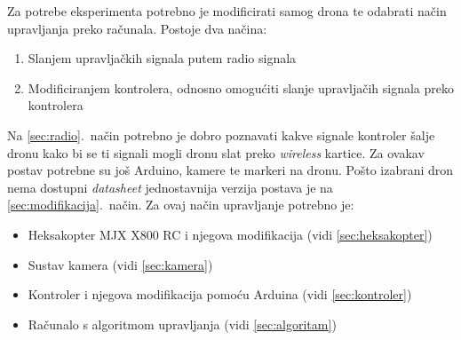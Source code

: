 \documentclass[times, utf8, diplomski]{fer}
\begin{document}
Za potrebe eksperimenta potrebno je modificirati samog drona te odabrati način upravljanja preko računala. Postoje dva načina:
\begin{enumerate}
\item Slanjem upravljačkih signala putem radio signala\label{sec:radio}
\item Modificiranjem kontrolera, odnosno omogućiti slanje upravljačih signala preko kontrolera\label{sec:modifikacija}
\end{enumerate}
Na \ref{sec:radio}.~način potrebno je dobro poznavati kakve signale kontroler šalje dronu kako bi se ti signali mogli dronu slat preko \emph{wireless} kartice. Za ovakav postav potrebne su još Arduino, kamere te markeri na dronu. Pošto izabrani dron nema dostupni \emph{datasheet} jednostavnija verzija postava je  na \ref{sec:modifikacija}.~način. Za ovaj način upravljanje potrebno je:
\begin{itemize}
\item Heksakopter MJX X800 RC i njegova modifikacija (vidi \ref{sec:heksakopter})
\item Sustav kamera (vidi \ref{sec:kamera})
\item Kontroler i njegova modifikacija pomoću Arduina (vidi \ref{sec:kontroler})
\item Računalo s algoritmom upravljanja (vidi \ref{sec:algoritam})
\end{itemize}
\end{document}
